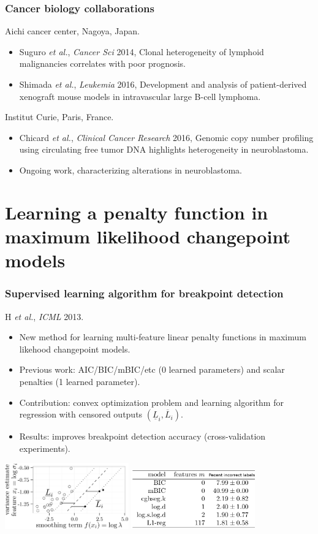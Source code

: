 \documentclass{beamer}
\begin{document}
\begin{frame}
  \frametitle{Cancer biology collaborations}
  Aichi cancer center, Nagoya, Japan.
  \begin{itemize}
  \item Suguro {\it et al.}, {\it Cancer Sci} 2014, Clonal
    heterogeneity of lymphoid malignancies correlates with poor
    prognosis.
  \item Shimada {\it et al.}, {\it Leukemia} 2016, Development and
    analysis of patient-derived xenograft mouse models in
    intravascular large B-cell lymphoma.
  \end{itemize}
  Institut Curie, Paris, France.
  \begin{itemize}
  \item Chicard {\it et al.}, {\it Clinical Cancer Research} 2016,
    Genomic copy number profiling using circulating free tumor DNA
    highlights heterogeneity in neuroblastoma.
  \item Ongoing work, characterizing alterations in neuroblastoma.
  \end{itemize}
\end{frame}

\section*{Learning a penalty function in maximum likelihood changepoint models}

\begin{frame}
  \frametitle{Supervised learning algorithm for breakpoint detection}
  H {\it et al.}, {\it ICML} 2013.
  \begin{itemize}
  \item New method for learning multi-feature linear penalty
    functions in maximum likehood changepoint models.
  \item Previous work: AIC/BIC/mBIC/etc (0 learned parameters)
    and scalar penalties (1 learned parameter).
  \item Contribution: convex optimization problem and learning
    algorithm for regression with censored outputs
    $(\underline L_i, \overline L_i)$.
  \item Results: improves breakpoint detection accuracy (cross-validation experiments).
  \end{itemize}
\includegraphics[width=0.4\textwidth]{screenshot-mmir-crop}
\includegraphics[width=0.4\textwidth]{screenshot-mmir-test-error}
\end{frame}
\end{document}
